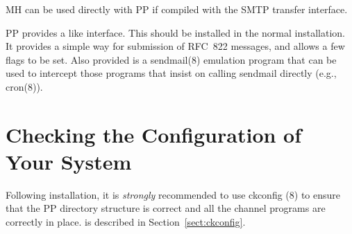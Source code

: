 MH\cite{MH6.5} can be used directly
with PP if compiled with the SMTP
transfer interface.

PP provides a  like interface. This should be installed
in the normal installation. It provides a simple way for submission of
RFC~822 messages, and allows a few flags to be set. Also provided is a
\man sendmail(8) emulation program that can be used to intercept those
programs that insist on calling sendmail directly (e.g., \man
cron(8)).

\section {Checking the Configuration of Your System}

Following installation, it is {\em strongly} recommended to use \man
ckconfig (8) to ensure that the PP directory structure is correct and
all the channel programs are correctly in place.
 is described in Section~\ref{sect:ckconfig}.
